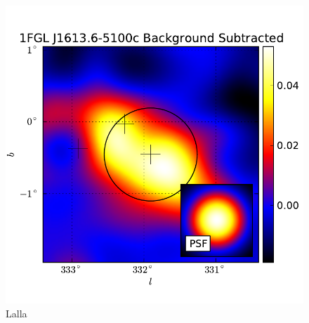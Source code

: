 \documentclass{emulateapj}
\begin{document}
  \begin{figure}
    \begin{center}
      \includegraphics[type=pdf,ext=.pdf,read=.pdf]{source_plots/source_1FGL_J1613.6-5100c}
    \end{center}
    \caption{Lalla}
  \end{figure}




  
\end{document}
